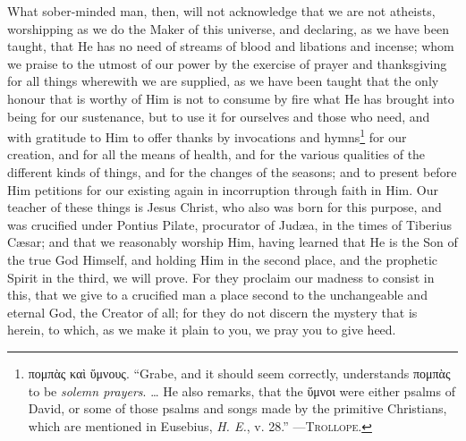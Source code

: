 
What sober-minded man, then, will not acknowledge that we are not atheists, worshipping as we do the Maker of this universe, and declaring, as we have been taught, that He has no need of streams of blood and libations and incense; whom we praise to the utmost of our power by the exercise of prayer and thanksgiving for all things wherewith we are supplied, as we have been taught that the only honour that is worthy of Him is not to consume by fire what He has brought into being for our sustenance, but to use it for ourselves and those who need, and with gratitude to Him to offer thanks by invocations and hymns\footnote{\textgreek{πομπὰς καὶ ὕμνους}. “Grabe, and it should seem correctly, understands \textgreek{πομπὰς} to be \emph{solemn prayers}. … He also remarks, that the \textgreek{ὕμνοι} were either psalms of David, or some of those psalms and songs made by the primitive Christians, which are mentioned in Eusebius, \emph{H. E.}, v. 28.” —\textsc{Trollope}.} for our creation, and for all the means of health, and for the various qualities of the different kinds of things, and for the changes of the seasons; and to present before Him petitions for our existing again in incorruption through faith in Him. Our teacher of these things is Jesus Christ, who also was born for this purpose, and was crucified under Pontius Pilate, procurator of Judæa, in the times of Tiberius Cæsar; and that we reasonably worship Him, having learned that He is the Son of the true  God Himself, and holding Him in the second place, and the prophetic Spirit in the third, we will prove. For they proclaim our madness to consist in this, that we give to a crucified man a place second to the unchangeable and eternal God, the Creator of all; for they do not discern the mystery that is herein, to which, as we make it plain to you, we pray you to give heed.


